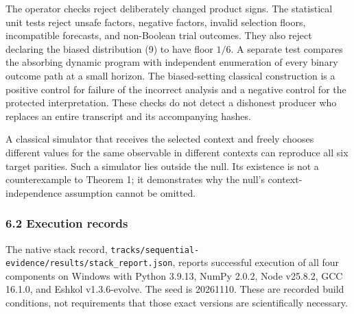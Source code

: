 \documentclass[10pt,a4paper]{article}
\begin{document}
The operator checks reject deliberately changed product signs. The
statistical unit tests reject unsafe factors, negative factors, invalid
selection floors, incompatible forecasts, and non-Boolean trial
outcomes. They also reject declaring the biased distribution (9) to have
floor \(1/6\). A separate test compares the absorbing dynamic program
with independent enumeration of every binary outcome path at a small
horizon. The biased-setting classical construction is a positive control
for failure of the incorrect analysis and a negative control for the
protected interpretation. These checks do not detect a dishonest
producer who replaces an entire transcript and its accompanying hashes.

A classical simulator that receives the selected context and freely
chooses different values for the same observable in different contexts
can reproduce all six target parities. Such a simulator lies outside the
null. Its existence is not a counterexample to Theorem 1; it
demonstrates why the null's context-independence assumption cannot be
omitted.

\subsubsection{6.2 Execution records}\label{execution-records}

The native stack record, \texttt{tracks/sequential-evidence/results/stack\_report.json}, reports
successful execution of all four components on Windows with Python
3.9.13, NumPy 2.0.2, Node v25.8.2, GCC 16.1.0, and Eshkol v1.3.6-evolve.
The seed is 20261110. These are recorded build conditions, not
requirements that those exact versions are scientifically necessary.
\end{document}
